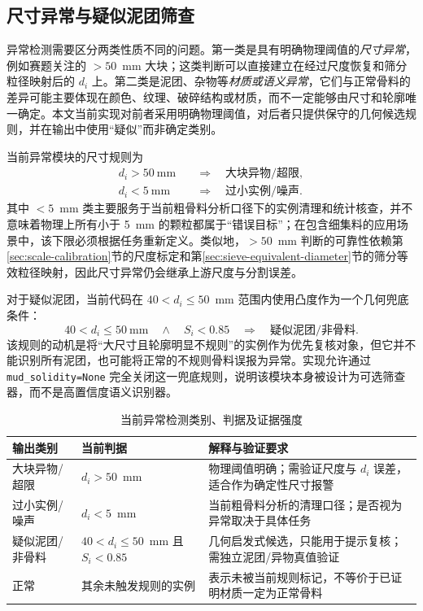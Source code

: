 \subsection{尺寸异常与疑似泥团筛查}
\label{sec:anomaly-detection}

异常检测需要区分两类性质不同的问题。第一类是具有明确物理阈值的\emph{尺寸异常}，例如赛题关注的 $>50$~mm 大块；这类判断可以直接建立在经过尺度恢复和筛分粒径映射后的 $d_i$ 上。第二类是泥团、杂物等\emph{材质或语义异常}，它们与正常骨料的差异可能主要体现在颜色、纹理、破碎结构或材质，而不一定能够由尺寸和轮廓唯一确定。本文当前实现对前者采用明确物理阈值，对后者只提供保守的几何候选规则，并在输出中使用“疑似”而非确定类别。

当前异常模块的尺寸规则为
\begin{align}
 d_i>50~\mathrm{mm} &\quad\Rightarrow\quad \text{大块异物/超限}, \label{eq:anomaly-oversize}\\
 d_i<5~\mathrm{mm} &\quad\Rightarrow\quad \text{过小实例/噪声}. \label{eq:anomaly-undersize}
\end{align}
其中 $<5$~mm 类主要服务于当前粗骨料分析口径下的实例清理和统计核查，并不意味着物理上所有小于 5~mm 的颗粒都属于“错误目标”；在包含细集料的应用场景中，该下限必须根据任务重新定义。类似地，$>50$~mm 判断的可靠性依赖第\ref{sec:scale-calibration}节的尺度标定和第\ref{sec:sieve-equivalent-diameter}节的筛分等效粒径映射，因此尺寸异常仍会继承上游尺度与分割误差。

对于疑似泥团，当前代码在 $40<d_i\le50$~mm 范围内使用凸度作为一个几何兜底条件：
\begin{equation}
 40<d_i\le50~\mathrm{mm}\quad\land\quad S_i<0.85
 \quad\Rightarrow\quad \text{疑似泥团/非骨料}.
 \label{eq:anomaly-mud}
\end{equation}
该规则的动机是将“大尺寸且轮廓明显不规则”的实例作为优先复核对象，但它并不能识别所有泥团，也可能将正常的不规则骨料误报为异常。实现允许通过 \texttt{mud\_solidity=None} 完全关闭这一兜底规则，说明该模块本身被设计为可选筛查器，而不是高置信度语义识别器。

\begin{table}[htbp]
\centering
\caption{当前异常检测类别、判据及证据强度}
\label{tab:anomaly-rules}
\small
\renewcommand{\arraystretch}{1.15}
\begin{tabular}{>{\raggedright\arraybackslash}p{2.5cm}>{\raggedright\arraybackslash}p{4.0cm}>{\raggedright\arraybackslash}p{6.4cm}}
\toprule
输出类别 & 当前判据 & 解释与验证要求 \\
\midrule
大块异物/超限 & $d_i>50$~mm & 物理阈值明确；需验证尺度与 $d_i$ 误差，适合作为确定性尺寸报警 \\
过小实例/噪声 & $d_i<5$~mm & 当前粗骨料分析的清理口径；是否视为异常取决于具体任务 \\
疑似泥团/非骨料 & $40<d_i\le50$~mm 且 $S_i<0.85$ & 几何启发式候选，只能用于提示复核；需独立泥团/异物真值验证 \\
正常 & 其余未触发规则的实例 & 表示未被当前规则标记，不等价于已证明材质一定为正常骨料 \\
\bottomrule
\end{tabular}
\end{table}

